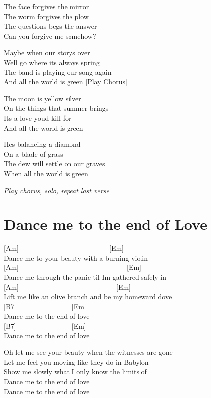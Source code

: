 \documentclass[
  letterpaper,
  a5paper]{memoir}
\begin{document}
The face forgives the mirror\\
The worm forgives the plow\\
The questions begs the answer\\
Can you forgive me somehow?

Maybe when our story\textquotesingle s over\\
We\textquotesingle ll go where it\textquotesingle s always spring\\
The band is playing our song again\\
And all the world is green {[}Play Chorus{]}

The moon is yellow silver\\
On the things that summer brings\\
It\textquotesingle s a love you\textquotesingle d kill for\\
And all the world is green

He\textquotesingle s balancing a diamond\\
On a blade of grass\\
The dew will settle on our graves\\
When all the world is green

\emph{Play chorus, solo, repeat last verse}

\hypertarget{dance-me-to-the-end-of-love}{%
\chapter{Dance me to the end of
Love}\label{dance-me-to-the-end-of-love}}

{[}Am{]}~~~~~~~~~~~~~~~~~~~~~~~~~~{[}Em{]}\\
Dance me to your beauty with a burning violin\\
{[}Am{]}~~~~~~~~~~~~~~~~~~~~~~~~~~~~~~~{[}Em{]}\\
Dance me through the panic \textquotesingle til I\textquotesingle m
gathered safely in\\
{[}Am{]}~~~~~~~~~~~~~~~~~~~~~~~~~~~~{[}Em{]}\\
Lift me like an olive branch and be my homeward dove\\
{[}B7{]}~~~~~~~~~~~~~~~~{[}Em{]}\\
Dance me to the end of love\\
{[}B7{]}~~~~~~~~~~~~~~~~{[}Em{]}\\
Dance me to the end of love

Oh let me see your beauty when the witnesses are gone\\
Let me feel you moving like they do in Babylon\\
Show me slowly what I only know the limits of\\
Dance me to the end of love\\
Dance me to the end of love
\end{document}

